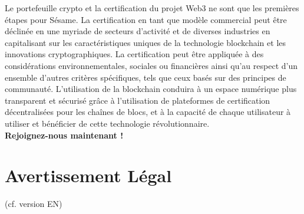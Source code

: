 ﻿\documentclass[a4paper]{article}
\begin{document}
Le portefeuille crypto et la certification du projet Web3 ne sont que les premières étapes pour Sésame. La certification en tant que modèle commercial peut être déclinée en une myriade de secteurs d'activité et de diverses industries en capitalisant sur les caractéristiques uniques de la technologie blockchain et les innovations cryptographiques.
La certification peut être appliquée à des considérations environnementales, sociales ou financières ainsi qu'au respect d'un ensemble d'autres critères spécifiques, tels que ceux basés sur des principes de communauté. L'utilisation de la blockchain conduira à un espace numérique plus transparent et sécurisé grâce à l'utilisation de plateformes de certification décentralisées pour les chaînes de blocs, et à la capacité de chaque utilisateur à utiliser et bénéficier de cette technologie révolutionnaire. \\

{\bf Rejoignez-nous maintenant !}

\newpage
\section{Avertissement Légal} 
(cf. version EN)
\end{document}
